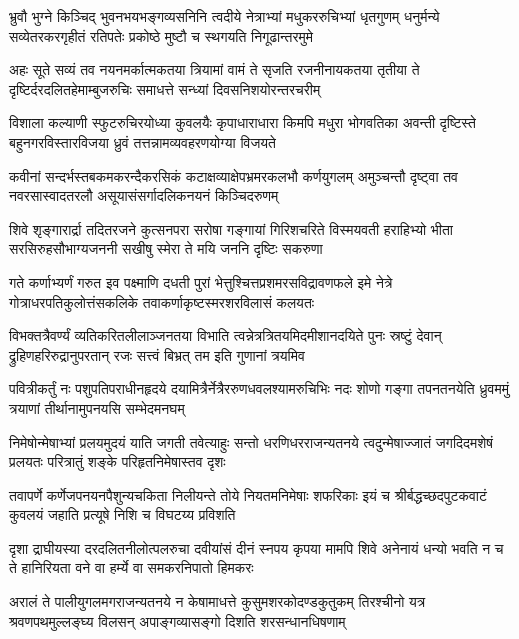 \fourlineindentedshloka
{भ्रुवौ भुग्ने  किञ्चिद् भुवनभयभङ्गव्यसनिनि}
{त्वदीये नेत्राभ्यां मधुकररुचिभ्यां धृतगुणम्}
{धनुर्मन्ये सव्येतरकरगृहीतं रतिपतेः}
{प्रकोष्ठे मुष्टौ च स्थगयति निगूढान्तरमुमे}%

\fourlineindentedshloka
{अहः सूते सव्यं तव नयनमर्कात्मकतया}
{त्रियामां वामं ते सृजति रजनीनायकतया}
{तृतीया ते दृष्टिर्दरदलितहेमाम्बुजरुचिः}
{समाधत्ते सन्ध्यां दिवसनिशयोरन्तरचरीम्}%

\fourlineindentedshloka
{विशाला कल्याणी स्फुटरुचिरयोध्या कुवलयैः}
{कृपाधाराधारा किमपि मधुरा भोगवतिका}
{अवन्ती दृष्टिस्ते बहुनगरविस्तारविजया}
{ध्रुवं तत्तन्नामव्यवहरणयोग्या विजयते}%

\fourlineindentedshloka
{कवीनां सन्दर्भस्तबकमकरन्दैकरसिकं}
{कटाक्षव्याक्षेपभ्रमरकलभौ कर्णयुगलम्}
{अमुञ्चन्तौ दृष्ट्वा तव नवरसास्वादतरलौ}
{असूयासंसर्गादलिकनयनं किञ्चिदरुणम्}%

\fourlineindentedshloka
{शिवे शृङ्गारार्द्रा तदितरजने कुत्सनपरा}
{सरोषा गङ्गायां गिरिशचरिते विस्मयवती}
{हराहिभ्यो भीता सरसिरुहसौभाग्यजननी}
{सखीषु स्मेरा ते मयि जननि दृष्टिः सकरुणा}%

\fourlineindentedshloka
{गते कर्णाभ्यर्णं गरुत इव पक्ष्माणि दधती}
{पुरां भेत्तुश्चित्तप्रशमरसविद्रावणफले}
{इमे नेत्रे गोत्राधरपतिकुलोत्तंसकलिके}
{तवाकर्णाकृष्टस्मरशरविलासं कलयतः}%

\fourlineindentedshloka
{विभक्तत्रैवर्ण्यं व्यतिकरितलीलाञ्जनतया}
{विभाति त्वन्नेत्रत्रितयमिदमीशानदयिते}
{पुनः स्रष्टुं देवान् द्रुहिणहरिरुद्रानुपरतान्}
{रजः सत्त्वं बिभ्रत् तम इति गुणानां त्रयमिव}%

\fourlineindentedshloka
{पवित्रीकर्तुं नः पशुपतिपराधीनहृदये}
{दयामित्रैर्नेत्रैररुणधवलश्यामरुचिभिः}
{नदः शोणो गङ्गा तपनतनयेति ध्रुवममुं}
{त्रयाणां तीर्थानामुपनयसि सम्भेदमनघम्}%

\fourlineindentedshloka
{निमेषोन्मेषाभ्यां प्रलयमुदयं याति जगती}
{तवेत्याहुः सन्तो धरणिधरराजन्यतनये}
{त्वदुन्मेषाज्जातं जगदिदमशेषं प्रलयतः}
{परित्रातुं शङ्के परिहृतनिमेषास्तव दृशः}%

\fourlineindentedshloka
{तवापर्णे कर्णेजपनयनपैशुन्यचकिता}
{निलीयन्ते तोये नियतमनिमेषाः शफरिकाः}
{इयं च श्रीर्बद्धच्छदपुटकवाटं कुवलयं}
{जहाति प्रत्यूषे निशि च विघटय्य प्रविशति}%

\fourlineindentedshloka
{दृशा द्राघीयस्या दरदलितनीलोत्पलरुचा}
{दवीयांसं दीनं स्नपय कृपया मामपि शिवे}
{अनेनायं धन्यो भवति न च ते हानिरियता}
{वने वा हर्म्ये वा समकरनिपातो हिमकरः}%

\fourlineindentedshloka
{अरालं ते पालीयुगलमगराजन्यतनये}
{न केषामाधत्ते कुसुमशरकोदण्डकुतुकम्}
{तिरश्चीनो यत्र श्रवणपथमुल्लङ्घ्य विलसन्}
{अपाङ्गव्यासङ्गो दिशति शरसन्धानधिषणाम्}%

